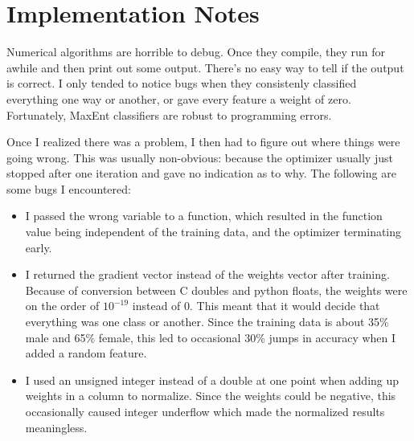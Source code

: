 \documentclass{article}
\begin{document}
\section{Implementation Notes}

Numerical algorithms are horrible to debug. Once they compile, they run for awhile and then print out some output. There's no easy way to tell if the output is correct. I only tended to notice bugs when they consistenly classified everything one way or another, or gave every feature a weight of zero. Fortunately, MaxEnt classifiers are robust to programming errors.

Once I realized there was a problem, I then had to figure out where things were going wrong. This was usually non-obvious: because the optimizer usually just stopped after one iteration and gave no indication as to why. The following are some bugs I encountered:

\begin{itemize}
\item I passed the wrong variable to a function, which resulted in the function value being independent of the training data, and the optimizer terminating early.
\item I returned the gradient vector instead of the weights vector after training. Because of conversion between C doubles and python floats, the weights were on the order of $10^{-19}$ instead of 0. This meant that it would decide that everything was one class or another. Since the training data is about 35\% male and 65\% female, this led to occasional 30\% jumps in accuracy when I added a random feature.
\item I used an unsigned integer instead of a double at one point when adding up weights in a column to normalize. Since the weights could be negative, this occasionally caused integer underflow which made the normalized results meaningless.
\end{itemize}
\end{document}
